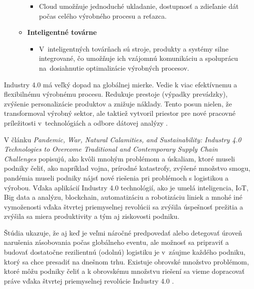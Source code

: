 \begin{itemize}
\begin{itemize}
\begin{itemize}
            \item Cloud umožňuje jednoduché ukladanie, dostupnosť a zdieľanie dát počas celého výrobného procesu a reťazca.
        \end{itemize}
     \item \textbf{Inteligentné továrne}
        \begin{itemize}
            \item V~inteligentných továrňach sú stroje, produkty a systémy silne integrované, čo umožňuje ich vzájomnú komunikáciu a spoluprácu na~dosiahnutie optimalizácie výrobných procesov. %
        \end{itemize}
   \end{itemize}
\end{itemize}

Industry 4.0 má veľký dopad na globálnej mierke. Vedie k viac efektívnemu a flexibilnému výrobnému procesu. Redukuje prestoje (výpadky prevádzky), zvýšenie personalizácie produktov a znižuje náklady. Tento posun nielen, že transformoval výrobný sektor, ale taktiež vytvoril priestor pre nové pracovné príležitosti v~technológiách a odbore dátovej analýzy \cite{rajan2023industry40}. 

V článku \textit{Pandemic, War, Natural Calamities, and Sustainability: Industry 4.0 Technologies to Overcome Traditional and Contemporary Supply Chain Challenges} popisujú, ako kvôli mnohým problémom a úskaliam, ktoré museli podniky čeliť, ako napríklad vojna, prírodné katastrofy, zvýšené množstvo smogu, pandémia museli podniky nájsť nové riešenia pri problémoch s logistikou a výrobou. Vďaka aplikácií Industry 4.0 technológií, ako je umelá inteligencia, IoT, Big data a analýzu, blockchain, automatizáciu a robotizáciu liniek a mnohé iné vymoženosti vďaka štvrtej priemyselnej revolúcii sa zvýšila úspešnosť prežitia a zvýšila sa miera produktivity a tým aj ziskovosti podniku.

Štúdia ukazuje, že aj keď je veľmi náročné predpovedať alebo detegovať úroveň narušenia zásobovania počas globálneho eventu, ale možnosť sa pripraviť a budovať dostatočne rezilientnú (odolnú) logistiku je v~záujme každého podniku, ktorý sa chce presadiť na dnešnom trhu. Existuje obrovské množstvo problémom, ktoré môžu podniky čeliť a k obrovskému množstvu riešení sa vieme dopracovať práve vďaka štvrtej priemyselnej revolúcie Industry 4.0 \cite{rajasanthi2022industry40}. 

